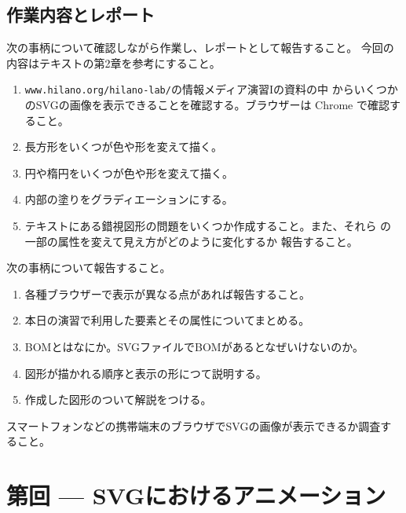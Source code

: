 \documentclass[a4j]{jarticle}
\renewcommand{\Section}[1]{%
\newpage \stepcounter{ReportNo}\section{第\theReportNo 回 --- #1}
}
\begin{document}
\subsection{作業内容とレポート}
次の事柄について確認しながら作業し、レポートとして報告すること。
今回の内容はテキストの第2章を参考にすること。
\begin{enumerate}
 \item \texttt{www.hilano.org/hilano-lab/}の情報メディア演習Iの資料の中
       からいくつかのSVGの画像を表示できることを確認する。ブラウザーは
       Chrome で確認すること。
 \item 長方形をいくつが色や形を変えて描く。
 \item 円や楕円をいくつが色や形を変えて描く。
 \item 内部の塗りをグラディエーションにする。
 \item テキストにある錯視図形の問題をいくつか作成すること。また、それら
       の一部の属性を変えて見え方がどのように変化するか
       報告すること。
\end{enumerate}
\begin{Report}\upshape
次の事柄について報告すること。
\begin{enumerate}
 \item 各種ブラウザーで表示が異なる点があれば報告すること。
 \item 本日の演習で利用した要素とその属性についてまとめる。
 \item BOMとはなにか。SVGファイルでBOMがあるとなぜいけないのか。
 \item 図形が描かれる順序と表示の形につて説明する。
 \item 作成した図形のついて解説をつける。
\end{enumerate}
\end{Report}
\begin{Report}[余力問題]\upshape
 スマートフォンなどの携帯端末のブラウザでSVGの画像が表示できるか調査すること。
\end{Report}
\newpage

\Section{SVGにおけるアニメーション}
\iffalse
	\subsection{ノートに関する注意}
ノートに関しては次のような点に注意して利用する。
\begin{itemize}
 \item 提出したノートは原則としてその週の金曜日までには返却するので必ず取りに来
ること。
 \item 予習した内容についてのメモや、疑問点なども書いておくこと
 \item 記入した日付も記入する
 \item 授業後に改良した点なども追記する
\end{itemize}
\fi
\end{document}
